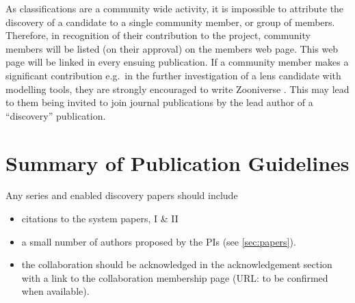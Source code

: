 \documentclass[a4paper,twocolumn]{article}
\begin{document}
As \SW classifications are a community wide activity, it is impossible to attribute the discovery of a candidate to a single community member, or group  of members. Therefore, in recognition of their contribution to the \SW project, \SW community members will be listed (on their approval) on the \SW members web page. This web page will be linked in every ensuing \SW publication. If a community member makes a significant contribution e.g.\ in the further investigation of a lens candidate with modelling tools, they are strongly encouraged to write Zooniverse \Letters. This may lead to them being invited to join journal publications by the lead author of a ``discovery'' publication. 




\section{Summary of Publication Guidelines}
\label{sec:publ}
Any \SW series and \SW enabled discovery papers should include
\begin{itemize}
\item citations to the \SW system papers, \SW I \& II
\item a small number of \SW authors proposed by the \SW PIs (see \ref{sec:papers}).
\item the collaboration should be acknowledged in the acknowledgement section with a link to the collaboration membership page (URL: to be confirmed when available).
\end{itemize}


\end{document}

